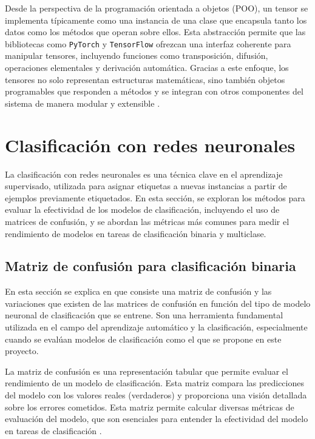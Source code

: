 Desde la perspectiva de la programación orientada a objetos (POO), un tensor se implementa típicamente como una instancia de una clase que encapsula tanto los datos como los métodos que operan sobre ellos. Esta abstracción permite que las bibliotecas como \texttt{PyTorch} y \texttt{TensorFlow} ofrezcan una interfaz coherente para manipular tensores, incluyendo funciones como transposición, difusión, operaciones elementales y derivación automática. Gracias a este enfoque, los tensores no solo representan estructuras matemáticas, sino también objetos programables que responden a métodos y se integran con otros componentes del sistema de manera modular y extensible \cite{chollet2018deep}.

\section{Clasificación con redes neuronales}
La clasificación con redes neuronales es una técnica clave en el aprendizaje supervisado, utilizada para asignar etiquetas a nuevas instancias a partir de ejemplos previamente etiquetados. En esta sección, se exploran los métodos para evaluar la efectividad de los modelos de clasificación, incluyendo el uso de matrices de confusión, y se abordan las métricas más comunes para medir el rendimiento de modelos en tareas de clasificación binaria y multiclase.

\subsection{Matriz de confusión para clasificación binaria} \label{sec.matriz-consfusion}
En esta sección se explica en que consiste una matriz de confusión y las variaciones que existen de las matrices de confusión en función del tipo de modelo neuronal de clasificación que se entrene. Son una herramienta fundamental utilizada en el campo del aprendizaje automático y la clasificación, especialmente cuando se evalúan modelos de clasificación como el que se propone en este proyecto.

La matriz de confusión es una representación tabular que permite evaluar el rendimiento de un modelo de clasificación. Esta matriz compara las predicciones del modelo con los valores reales (verdaderos) y proporciona una visión detallada sobre los errores cometidos. Esta matriz permite calcular diversas métricas de evaluación del modelo, que son esenciales para entender la efectividad del modelo en tareas de clasificación \cite{han2011data}.

